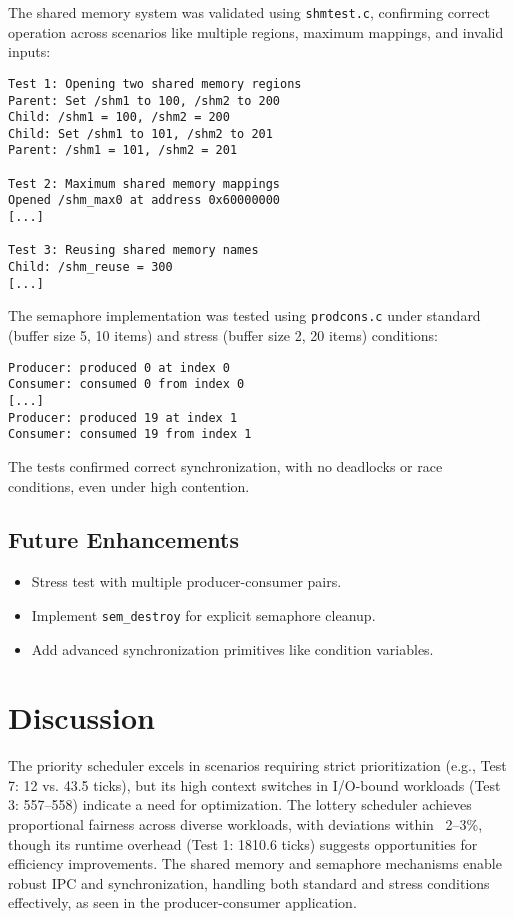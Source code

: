 \documentclass[12pt]{article}
\begin{document}
The shared memory system was validated using \texttt{shmtest.c}, confirming correct operation across scenarios like multiple regions, maximum mappings, and invalid inputs:

\begin{lstlisting}
Test 1: Opening two shared memory regions
Parent: Set /shm1 to 100, /shm2 to 200
Child: /shm1 = 100, /shm2 = 200
Child: Set /shm1 to 101, /shm2 to 201
Parent: /shm1 = 101, /shm2 = 201

Test 2: Maximum shared memory mappings
Opened /shm_max0 at address 0x60000000
[...]

Test 3: Reusing shared memory names
Child: /shm_reuse = 300
[...]
\end{lstlisting}

The semaphore implementation was tested using \texttt{prodcons.c} under standard (buffer size 5, 10 items) and stress (buffer size 2, 20 items) conditions:

\begin{lstlisting}
Producer: produced 0 at index 0
Consumer: consumed 0 from index 0
[...]
Producer: produced 19 at index 1
Consumer: consumed 19 from index 1
\end{lstlisting}

The tests confirmed correct synchronization, with no deadlocks or race conditions, even under high contention.

\subsection{Future Enhancements}
\label{subsec:shared-future}

\begin{itemize}
    \item Stress test with multiple producer-consumer pairs.
    \item Implement \texttt{sem\_destroy} for explicit semaphore cleanup.
    \item Add advanced synchronization primitives like condition variables.
\end{itemize}

\section{Discussion}
\label{sec:discussion}

The priority scheduler excels in scenarios requiring strict prioritization (e.g., Test 7: 12 vs. 43.5 ticks), but its high context switches in I/O-bound workloads (Test 3: 557–558) indicate a need for optimization. The lottery scheduler achieves proportional fairness across diverse workloads, with deviations within ~2–3\%, though its runtime overhead (Test 1: 1810.6 ticks) suggests opportunities for efficiency improvements. The shared memory and semaphore mechanisms enable robust IPC and synchronization, handling both standard and stress conditions effectively, as seen in the producer-consumer application.
\end{document}
